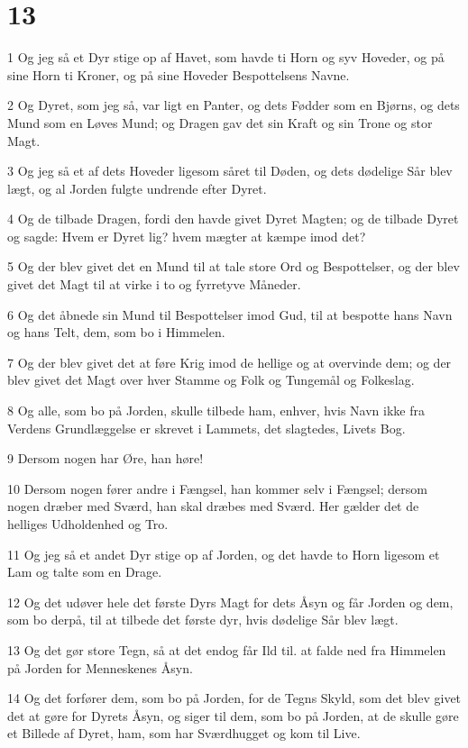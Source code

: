 \chapter{13}

\par 1 Og jeg så et Dyr stige op af Havet, som havde ti Horn og syv Hoveder, og på sine Horn ti Kroner, og på sine Hoveder Bespottelsens Navne.
\par 2 Og Dyret, som jeg så, var ligt en Panter, og dets Fødder som en Bjørns, og dets Mund som en Løves Mund; og Dragen gav det sin Kraft og sin Trone og stor Magt.
\par 3 Og jeg så et af dets Hoveder ligesom såret til Døden, og dets dødelige Sår blev lægt, og al Jorden fulgte undrende efter Dyret.
\par 4 Og de tilbade Dragen, fordi den havde givet Dyret Magten; og de tilbade Dyret og sagde: Hvem er Dyret lig? hvem mægter at kæmpe imod det?
\par 5 Og der blev givet det en Mund til at tale store Ord og Bespottelser, og der blev givet det Magt til at virke i to og fyrretyve Måneder.
\par 6 Og det åbnede sin Mund til Bespottelser imod Gud, til at bespotte hans Navn og hans Telt, dem, som bo i Himmelen.
\par 7 Og der blev givet det at føre Krig imod de hellige og at overvinde dem; og der blev givet det Magt over hver Stamme og Folk og Tungemål og Folkeslag.
\par 8 Og alle, som bo på Jorden, skulle tilbede ham, enhver, hvis Navn ikke fra Verdens Grundlæggelse er skrevet i Lammets, det slagtedes, Livets Bog.
\par 9 Dersom nogen har Øre, han høre!
\par 10 Dersom nogen fører andre i Fængsel, han kommer selv i Fængsel; dersom nogen dræber med Sværd, han skal dræbes med Sværd. Her gælder det de helliges Udholdenhed og Tro.
\par 11 Og jeg så et andet Dyr stige op af Jorden, og det havde to Horn ligesom et Lam og talte som en Drage.
\par 12 Og det udøver hele det første Dyrs Magt for dets Åsyn og får Jorden og dem, som bo derpå, til at tilbede det første dyr, hvis dødelige Sår blev lægt.
\par 13 Og det gør store Tegn, så at det endog får Ild til. at falde ned fra Himmelen på Jorden for Menneskenes Åsyn.
\par 14 Og det forfører dem, som bo på Jorden, for de Tegns Skyld, som det blev givet det at gøre for Dyrets Åsyn, og siger til dem, som bo på Jorden, at de skulle gøre et Billede af Dyret, ham, som har Sværdhugget og kom til Live.
